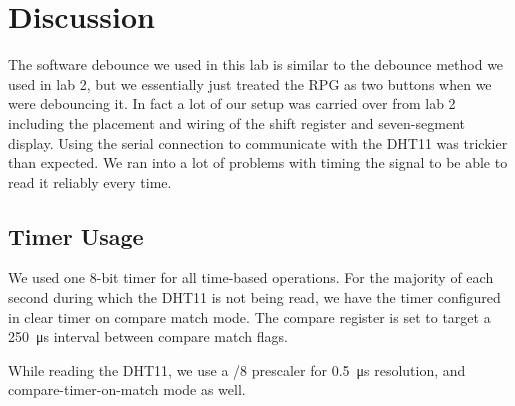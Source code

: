 \documentclass[12pt,letterpaper]{article}
\begin{document}
\section{Discussion}
The software debounce we used in this lab is similar to the debounce method we 
used in lab 2, but we essentially just treated the RPG as two buttons when we 
were debouncing it. In fact a lot of our setup was carried over from lab 2 
including the placement and wiring of the shift register and seven-segment 
display. Using the serial connection to communicate with the DHT11 was trickier 
than expected. We ran into a lot of problems with timing the signal to be able 
to read it reliably every time.

\subsection*{Timer Usage}
We used one 8-bit timer for all time-based operations. For the majority of each
second during which the DHT11 is not being read, we have the timer configured in
clear timer on compare match mode. The compare register is set to target a \SI{250}{\micro\second}
interval between compare match flags.
\par\vspace*{2ex}
While reading the DHT11, we use a /8 prescaler for \SI{0.5}{\micro\second} resolution,
and compare-timer-on-match mode as well.
\end{document}

